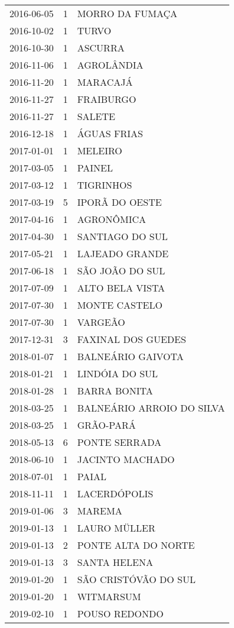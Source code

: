\documentclass[
	12pt,				%
	openright,			%
	oneside,			%
	a4paper,			%
	english,			%
	french,				%
	spanish,			%
	brazil				%
	dvipsnames, table]{abntex2}
\begin{document}
\begin{longtable}[htbp]{ccl}
2016-06-05 & 1 & MORRO DA FUMAÇA \\
2016-10-02 & 1 & TURVO \\
2016-10-30 & 1 & ASCURRA \\
2016-11-06 & 1 & AGROLÂNDIA \\
2016-11-20 & 1 & MARACAJÁ \\
2016-11-27 & 1 & FRAIBURGO \\
2016-11-27 & 1 & SALETE \\
2016-12-18 & 1 & ÁGUAS FRIAS \\
2017-01-01 & 1 & MELEIRO \\
2017-03-05 & 1 & PAINEL \\
2017-03-12 & 1 & TIGRINHOS \\
2017-03-19 & 5 & IPORÃ DO OESTE \\
2017-04-16 & 1 & AGRONÔMICA \\
2017-04-30 & 1 & SANTIAGO DO SUL \\
2017-05-21 & 1 & LAJEADO GRANDE \\
2017-06-18 & 1 & SÃO JOÃO DO SUL \\
2017-07-09 & 1 & ALTO BELA VISTA \\
2017-07-30 & 1 & MONTE CASTELO \\
2017-07-30 & 1 & VARGEÃO \\
2017-12-31 & 3 & FAXINAL DOS GUEDES \\
2018-01-07 & 1 & BALNEÁRIO GAIVOTA \\
2018-01-21 & 1 & LINDÓIA DO SUL \\
2018-01-28 & 1 & BARRA BONITA \\
2018-03-25 & 1 & BALNEÁRIO ARROIO DO SILVA \\
2018-03-25 & 1 & GRÃO-PARÁ \\
2018-05-13 & 6 & PONTE SERRADA \\
2018-06-10 & 1 & JACINTO MACHADO \\
2018-07-01 & 1 & PAIAL \\
2018-11-11 & 1 & LACERDÓPOLIS \\
2019-01-06 & 3 & MAREMA \\
2019-01-13 & 1 & LAURO MÜLLER \\
2019-01-13 & 2 & PONTE ALTA DO NORTE \\
2019-01-13 & 3 & SANTA HELENA \\
2019-01-20 & 1 & SÃO CRISTÓVÃO DO SUL \\
2019-01-20 & 1 & WITMARSUM \\
2019-02-10 & 1 & POUSO REDONDO \\

\end{longtable}
\end{document}
